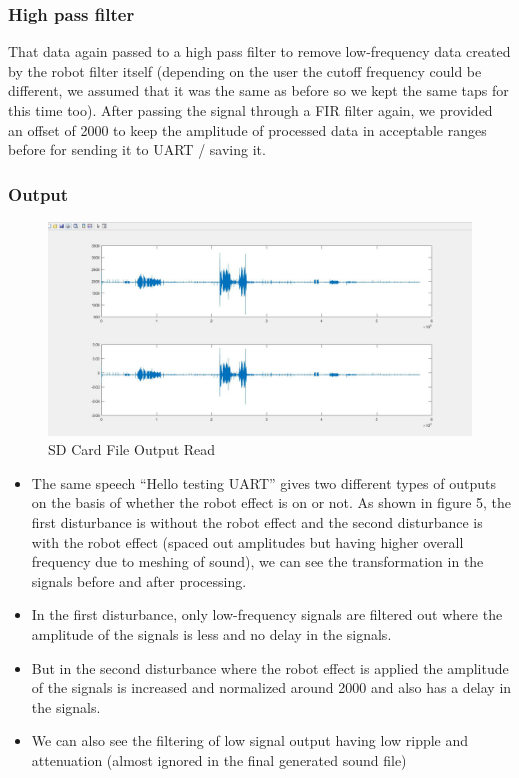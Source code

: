 \documentclass[11pt]{article}
\begin{document}
\subsubsection*{High pass filter}
\label{sec:org53ae40d}
That data again passed to a high pass filter to remove low-frequency data created by the robot filter itself (depending on the user the cutoff frequency could be different, we assumed that it was the same as before so we kept the same taps for this time too). After passing the signal through a FIR filter again, we provided an offset of 2000 to keep the amplitude of processed data in acceptable ranges before for sending it to UART / saving it.

\subsubsection*{Output}
\label{sec:org050fe83}
\begin{figure}[H]
    \centering
    \includegraphics[width=1\textwidth, trim={0cm 0cm 0cm 0cm}, clip]{SD_Read.pdf}
    \caption{SD Card File Output Read}
    \end{figure}

\begin{itemize}
\item The same speech ``Hello testing UART'' gives two different types of outputs on the basis of whether the robot effect is on or not. As shown in figure 5, the first disturbance is without the robot effect and the second disturbance is with the robot effect (spaced out amplitudes but having higher overall frequency due to meshing of sound), we can see the transformation in the signals before and after processing.
\item In the first disturbance, only low-frequency signals are filtered out where the amplitude of the signals is less and no delay in the signals.
\item But in the second disturbance where the robot effect is applied the amplitude of the signals is increased and normalized around 2000 and also has a delay in the signals.
\item We can also see the filtering of low signal output having low ripple and attenuation (almost ignored in the final generated sound file)
\end{itemize}
\end{document}
